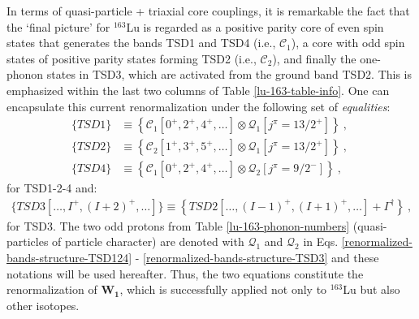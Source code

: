 In terms of quasi-particle + triaxial core couplings, it is remarkable the fact that the `final picture' for $^{163}$Lu is regarded as a positive parity core of even spin states that generates the bands TSD1 and TSD4 (i.e., $\mathscr{C}_1$), a core with odd spin states of positive parity states forming TSD2 (i.e., $\mathscr{C}_2$), and finally the one-phonon states in TSD3, which are activated from the ground band TSD2. This is emphasized within the last two columns of Table \ref{lu-163-table-info}. One can encapsulate this current renormalization under the following set of \emph{equalities}:
\begin{align}
    \{TSD1\}&\equiv\left\{\mathscr{C}_1\left[0^+,2^+,4^+,\dots\right] \otimes \mathcal{Q}_1[j^\pi=13/2^+]\right\}\ ,\ \nonumber\\
    \{TSD2\}&\equiv\left\{\mathscr{C}_2\left[1^+,3^+,5^+,\dots\right] \otimes \mathcal{Q}_1[j^\pi=13/2^+]\right\}\ ,\ \nonumber\\
    \{TSD4\}&\equiv\left\{\mathscr{C}_1\left[0^+,2^+,4^+,\dots\right] \otimes \mathcal{Q}_2[j^\pi=9/2^-]\right\}\ ,
    \label{renormalized-bands-structure-TSD124}
\end{align}
for TSD1-2-4 and:
\begin{align}
    \{TSD3\left[\dots,I^+,(I+2)^+,\dots\right]\}\equiv\left\{TSD2\left[\dots,(I-1)^+,(I+1)^+,\dots\right]+\Gamma^\dagger\right\}\ ,
    \label{renormalized-bands-structure-TSD3}
\end{align}
for TSD3. The two odd protons from Table \ref{lu-163-phonon-numbers} (quasi-particles of particle character) are denoted with $\mathcal{Q}_1$ and $\mathcal{Q}_2$ in Eqs. \ref{renormalized-bands-structure-TSD124} - \ref{renormalized-bands-structure-TSD3} and these notations will be used hereafter. Thus, the two equations constitute the renormalization of $\mathbf{W_1}$, which is successfully applied not only to $^{163}$Lu but also other isotopes.%


